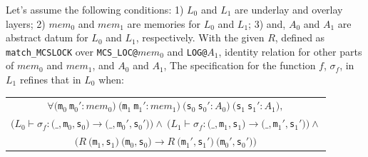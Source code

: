  \begin{theorem}
 \label{thm:machine-state-refinement} Let's assume the following conditions:
 1) $L_0$ and $L_1$ are underlay and overlay layers;
 2) $mem_0$ and $mem_1$ are memories for $L_0$ and $L_1$;
 3) and, $A_0$ and $A_1$ are abstract datum for $L_0$ and $L_1$, respectively.
 With the given $R$, defined as \lstinline$match_MCSLOCK$ 
 over \lstinline$MCS_LOC@$$mem_0$ and \lstinline$LOG@$$A_1$, 
 identity relation for other parts of $mem_0$ and $mem_1$, and $A_0$ and $A_1$, 
 The specification for the function $f$, $\sigma_f$, in $L_1$ refines that in $L_0$ when:
 \begin{center}
 \begin{tabular}{c}
 $\forall ($\lstinline$m$$_{0} \ $\lstinline$m$$_{0}' : mem_0)\ ($\lstinline$m$$_{1} \ $\lstinline$m$$_{1}' : mem_1)\ ($\lstinline$s$$_{0} \ $\lstinline$s$$_{0}' : A_0)\ ($\lstinline$s$$_{1} \ $\lstinline$s$$_{1}' : A_1),$\\
 $(L_0 \vdash \sigma_f : (\_, $\lstinline$m$$_0, $\lstinline$s$$_0) \rightarrow (\_, $\lstinline$m$$_0', $\lstinline$s$$_0')) \wedge\
 (L_1 \vdash \sigma_f : (\_, $\lstinline$m$$_1, $\lstinline$s$$_1) \rightarrow (\_, $\lstinline$m$$_1', $\lstinline$s$$_1')) \wedge$\\
 $(R\ ($\lstinline$m$$_1, $\lstinline$s$$_1)\ ($\lstinline$m$$_0, $\lstinline$s$$_0) \rightarrow R\ ($\lstinline$m$$_1', $\lstinline$s$$_1')\ ($\lstinline$m$$_0', $\lstinline$s$$_0'))$\\
 \end{tabular}
 \end{center}
 \end{theorem}

%
%

